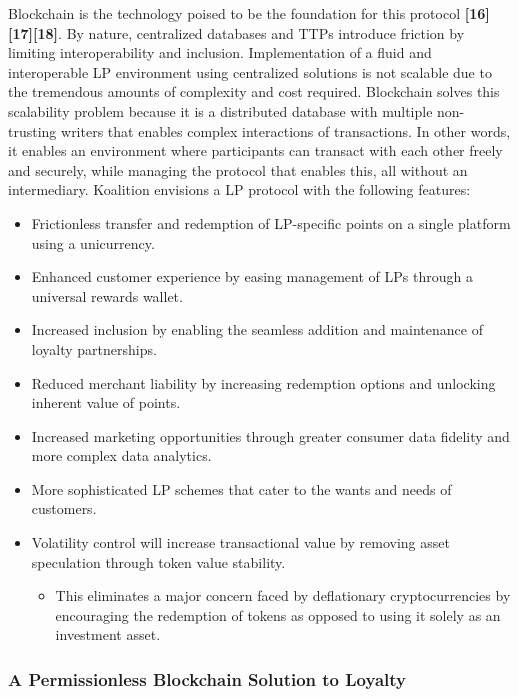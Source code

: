 Blockchain is the technology poised to be the foundation for this protocol \textbf{[16][17][18]}. By nature, centralized databases and TTPs introduce friction by limiting interoperability and inclusion. Implementation of a fluid and interoperable LP environment using centralized solutions is not scalable due to the tremendous amounts of complexity and cost required. Blockchain solves this scalability problem because it is a distributed database with multiple non-trusting writers that enables complex interactions of transactions. In other words, it enables an environment where participants can transact with each other freely and securely, while managing the protocol that enables this, all without an intermediary. Koalition envisions a LP protocol with the following features:
%
\begin{itemize}
\item{Frictionless transfer and redemption of LP-specific points on a single platform using a unicurrency.}
\item{Enhanced customer experience by easing management of LPs through a universal rewards wallet.}
\item{Increased inclusion by enabling the seamless addition and maintenance of loyalty partnerships.}
\item{Reduced merchant liability by increasing redemption options and unlocking inherent value of points.}
\item{Increased marketing opportunities through greater consumer data fidelity and more complex data analytics.}
\item{More sophisticated LP schemes that cater to the wants and needs of customers.}
\item{Volatility control will increase transactional value by removing asset speculation through token value stability.}
	\begin{itemize}
	\item{This eliminates a major concern faced by deflationary cryptocurrencies by encouraging the redemption of tokens as opposed to using it solely as an investment asset.}
	\end{itemize}
\end{itemize}

\subsubsection{A Permissionless Blockchain Solution to Loyalty}

